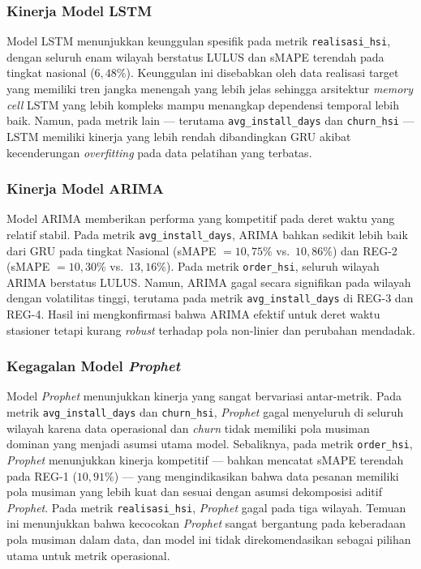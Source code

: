 \subsubsection{Kinerja Model LSTM}

Model LSTM menunjukkan keunggulan spesifik pada metrik \texttt{realisasi\_}\allowbreak\texttt{hsi}, dengan seluruh enam wilayah berstatus LULUS dan sMAPE terendah pada tingkat nasional ($6{,}48\%$). Keunggulan ini disebabkan oleh data realisasi target yang memiliki tren jangka menengah yang lebih jelas sehingga arsitektur \textit{memory cell} LSTM yang lebih kompleks mampu menangkap dependensi temporal lebih baik. Namun, pada metrik lain --- terutama \texttt{avg\_}\allowbreak\texttt{install\_}\allowbreak\texttt{days} dan \texttt{churn\_}\allowbreak\texttt{hsi} --- LSTM memiliki kinerja yang lebih rendah dibandingkan GRU akibat kecenderungan \textit{overfitting} pada data pelatihan yang terbatas.

\subsubsection{Kinerja Model ARIMA}

Model ARIMA memberikan performa yang kompetitif pada deret waktu yang relatif stabil. Pada metrik \texttt{avg\_}\allowbreak\texttt{install\_}\allowbreak\texttt{days}, ARIMA bahkan sedikit lebih baik dari GRU pada tingkat Nasional (sMAPE \allowbreak $= 10{,}75\%$ vs.\ \allowbreak $10{,}86\%$) dan REG-2 (sMAPE $= 10{,}30\%$ vs.\ $13{,}16\%$). Pada metrik \texttt{order\_}\allowbreak\texttt{hsi}, seluruh wilayah ARIMA berstatus LULUS. Namun, ARIMA gagal secara signifikan pada wilayah dengan volatilitas tinggi, terutama pada metrik \texttt{avg\_}\allowbreak\texttt{install\_}\allowbreak\texttt{days} di REG-3 dan REG-4. Hasil ini mengkonfirmasi bahwa ARIMA efektif untuk deret waktu stasioner tetapi kurang \textit{robust} terhadap pola non-linier dan perubahan mendadak.

\subsubsection{Kegagalan Model \textit{Prophet}}

Model \textit{Prophet} menunjukkan kinerja yang sangat bervariasi antar-metrik. Pada metrik \texttt{avg\_}\allowbreak\texttt{install\_}\allowbreak\texttt{days} dan \texttt{churn\_}\allowbreak\texttt{hsi}, \textit{Prophet} gagal menyeluruh di seluruh wilayah karena data operasional dan \textit{churn} tidak memiliki pola musiman dominan yang menjadi asumsi utama model. Sebaliknya, pada metrik \texttt{order\_}\allowbreak\texttt{hsi}, \textit{Prophet} menunjukkan kinerja kompetitif --- bahkan mencatat sMAPE terendah pada REG-1 ($10{,}91\%$) --- yang mengindikasikan bahwa data pesanan memiliki pola musiman yang lebih kuat dan sesuai dengan asumsi dekomposisi aditif \textit{Prophet}. Pada metrik \texttt{realisasi\_}\allowbreak\texttt{hsi}, \textit{Prophet} gagal pada tiga wilayah. Temuan ini menunjukkan bahwa kecocokan \textit{Prophet} sangat bergantung pada keberadaan pola musiman dalam data, dan model ini tidak direkomendasikan sebagai pilihan utama untuk metrik operasional.


